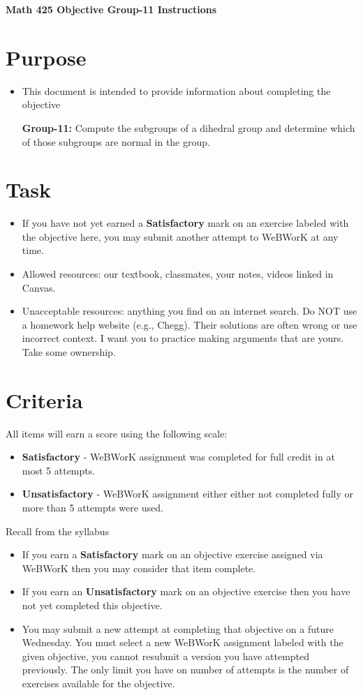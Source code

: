 \documentclass[12pt]{article}
\begin{document}
	\begin{center}
		{\Large \bf Math 425 Objective Group-11 Instructions}
	\end{center}
	\section*{Purpose}
	\begin{itemize}
		\item This document is intended to provide information about completing the objective
		
			\textbf{Group-11:} Compute the subgroups of a dihedral group and determine which of those subgroups are normal in the group.

	\end{itemize}
	\section*{Task}
	\begin{itemize}
		\item If you have not yet earned a \textbf{Satisfactory} mark on an exercise labeled with the objective here, you may submit another attempt to WeBWorK at any time.
		\item Allowed resources: our textbook, classmates, your notes, videos linked in Canvas.
		\item Unacceptable resources: anything you find on an internet search. Do NOT use a homework help website (e.g., Chegg). Their solutions are often wrong or use incorrect context.  I want you to practice making arguments that are yours. Take some ownership.
	\end{itemize}
	\section*{Criteria}
	All items will earn a score using the following scale:
	\begin{itemize}
		\item \textbf{Satisfactory} - WeBWorK assignment was completed for full credit in at most 5 attempts.
		\item \textbf{Unsatisfactory} - WeBWorK assignment either either not completed fully or more than 5 attempts were used.
	\end{itemize}
	Recall from the syllabus
	\begin{itemize}
		\item If you earn a \textbf{Satisfactory} mark on an objective exercise assigned via WeBWorK  then you may consider that item complete. 
		\item If you earn an \textbf{Unsatisfactory} mark on an objective exercise then you have not yet completed this objective.
		\item You may submit a new attempt at completing that objective on a future Wednesday. You must select a new WeBWorK assignment labeled with the given objective, you cannot resubmit a version you have attempted previously.  The only limit you have on number of attempts is the number of exercises available for the objective.
	\end{itemize}
	
\end{document}
